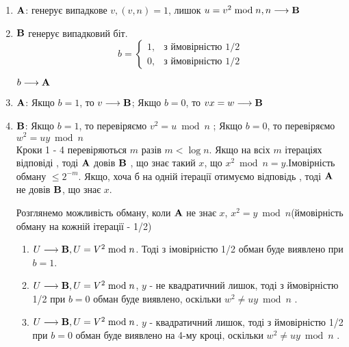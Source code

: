 \begin{enumerate}

\item $\bold{A}$: генерує випадкове $v, (v,n) = 1$, лишок $u = v^2\bmod n, n\longrightarrow \bold{B}$
\item $\bold{B}$ генерує випадковий біт. 
\begin{equation*}
b = 
	\begin{cases}
		1, &\text{з ймовірністю 1/2}\\
		0, &\text{з ймовірністю 1/2}
	\end{cases}
\end{equation*}
\begin{center}
$b \longrightarrow \bold{A}$
\end{center}
\item $\bold{A}$: Якщо $b = 1$, то $v\longrightarrow \bold{B}$; Якщо $b = 0$, то $vx = w\longrightarrow \bold{B}$ 
\item $\bold{B}$: Якщо $b = 1$, то перевіряємо $v^2 = u\bmod n$ ; Якщо $b = 0$, то перевіряємо $w^2 = uy\bmod n $\\
Кроки 1 - 4 перевіряються $m$ разів $m < \log n$. Якщо на всіх $m$ ітераціях відповіді \grqq, тоді $\bold{A}$ довів $\bold{B}$ , що знає такий $x$, що $x^2\bmod n = y$.Імовірність обману $\leqslant 2^{-m}$. Якщо, хоча б на одній ітерації отимуємо відповідь  \grqq, тоді $\bold{A}$ не довів $\bold{B}$, що знає $x$.\\
\par Розглянемо можливість обману, коли $\bold{A}$ не знає $x$, $x^2 = y\bmod n$(ймовірність обману на кожній ітерації - 1/2)
\begin{enumerate}[label=\alph*)]
\item $U\longrightarrow \bold{B}, U = V^2\bmod n$. Тоді з імовірністю 1/2 обман буде виявлено при $b = 1$.
\item $U\longrightarrow \bold{B}, U = V^2\bmod n$, $y$ - не квадратичний лишок, тоді з ймовірністю 1/2 при $b = 0$ обман буде виявлено, оскільки $w^2\ne uy\bmod n$ .
\item $U\longrightarrow \bold{B}, U = V^2\bmod n$. $y$ - квадратичний лишок, тоді з ймовірністю 1/2 при $b = 0$ обман буде виявлено на 4-му кроці, оскільки $w^2\ne uy\bmod n$ .
\end{enumerate}
\end{enumerate}

